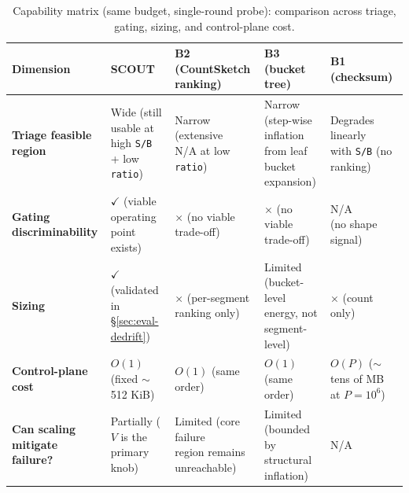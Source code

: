 \begin{table}[!thbp]
\centering
\small
\begin{tabular}{lllll}
\toprule
Dimension & SCOUT & B2 (CountSketch ranking) & B3 (bucket tree) & B1 (checksum) \\
\midrule
\textbf{Triage feasible region} & \shortstack{Wide (still usable at \\ high \texttt{S/B} + low \texttt{ratio})} & \shortstack{Narrow (extensive \\ N/A at low \texttt{ratio})} & \shortstack{Narrow (step-wise \\ inflation from leaf \\ bucket expansion)} & \shortstack{Degrades linearly \\ with \texttt{S/B} (no ranking)} \\
\midrule
\textbf{Gating discriminability} & \shortstack{$\checkmark$ (viable operating \\ point exists)} & \shortstack{$\times$ (no viable \\ trade-off)} & \shortstack{$\times$ (no viable \\ trade-off)} & \shortstack{N/A \\ (no shape signal)} \\
\midrule
\textbf{Sizing} & \shortstack{$\checkmark$ \\ (validated in \S\ref{sec:eval-dedrift})} & \shortstack{$\times$ \\ (per-segment ranking only)} & \shortstack{Limited (bucket-level \\ energy, not segment-level)} & \shortstack{$\times$ \\ (count only)} \\
\midrule
\textbf{Control-plane cost} & \shortstack{$O(1)$ \\ (fixed $\sim$512 KiB)} & \shortstack{$O(1)$ \\ (same order)} & \shortstack{$O(1)$ \\ (same order)} & \shortstack{$O(P)$ ($\sim$tens of MB \\ at $P=10^6$)} \\
\midrule
\shortstack{\textbf{Can scaling} \\ \textbf{mitigate failure?}} & \shortstack{Partially \\ ($V$ is the primary knob)} & \shortstack{Limited (core failure \\ region remains unreachable)} & \shortstack{Limited (bounded by \\ structural inflation)} & N/A \\
\bottomrule
\end{tabular}
\caption{Capability matrix (same budget, single-round probe): comparison across triage, gating, sizing, and control-plane cost.}
\label{tab:c5-2}
\end{table}


